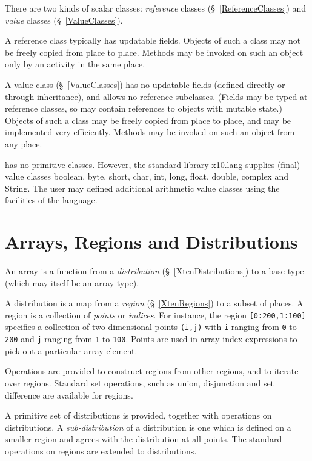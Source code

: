 There are two kinds of scalar classes: {\em reference} classes
(\S~\ref{ReferenceClasses}) and {\em value} classes
(\S~\ref{ValueClasses}).

A reference class typically has updatable fields. Objects of such a
class may not be freely copied from place to place. Methods may be
invoked on such an object only by an activity in the same place.

A value class (\S~\ref{ValueClasses}) has no updatable fields (defined
directly or through inheritance), and allows no reference
subclasses. (Fields may be typed at reference classes, so may contain
references to objects with mutable state.) Objects of such a class may
be freely copied from place to place, and may be implemented very
efficiently. Methods may be invoked on such an object from any place.

\Xten{} has no primitive classes. However, the standard library {\cf
x10.lang} supplies (final) value classes {\cf boolean}, {\cf byte},
{\cf short}, {\cf char}, {\cf int}, {\cf long}, {\cf float}, {\cf
double}, {\cf complex} and {\cf String}. The user may defined
additional arithmetic value classes using the facilities of the
language.

\section{Arrays, Regions and Distributions}
An \Xten{} array is a function from a {\em distribution}
(\S~\ref{XtenDistributions}) to a base type (which may itself be an
array type).

A distribution is a map from a {\em region} (\S~\ref{XtenRegions}) to a
subset of places.  A region is a collection of {\em points} or
{\em indices}. For instance, the region {\tt [0:200,1:100]} specifies
a collection of two-dimensional points {\tt (i,j)} with 
{\tt i} ranging from {\tt 0} to {\tt 200} and {\tt j} ranging
from {\tt 1} to {\tt 100}. Points are used in array index expressions
to pick out a particular array element.

Operations are provided to construct regions from other regions, and
to iterate over regions. Standard set operations, such as union,
disjunction and set difference are available for regions.

A primitive set of distributions is provided, together with operations
on distributions. A {\em sub-distribution} of a distribution is one
which is defined on a smaller region and agrees with the distribution
at all points.  The standard operations on regions are extended to
distributions.

